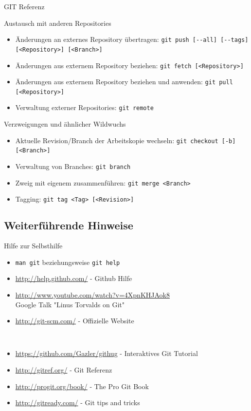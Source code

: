 \begin{frame}{GIT Referenz}
\begin{block}{Austausch mit anderen Repositories}
		\begin{itemize}
			\item Änderungen an externes Repository übertragen: \verb|git push [--all] [--tags] [<Repository>] [<Branch>]|
			\item Änderungen aus externem Repository beziehen: \verb|git fetch [<Repository>]|
			\item Änderungen aus externem Repository beziehen und anwenden: \verb|git pull [<Repository>]|
			\item Verwaltung externer Repositories: \verb|git remote|
		\end{itemize}
	\end{block}
	\begin{block}{Verzweigungen und ähnlicher Wildwuchs}
		\begin{itemize}
			\item Aktuelle Revision/Branch der Arbeitskopie wechseln: \verb|git checkout [-b] [<Branch>]|
			\item Verwaltung von Branches: \verb|git branch|
			\item Zweig mit eigenem zusammenführen: \verb|git merge <Branch>|
			\item Tagging: \verb|git tag <Tag> [<Revision>]|
		\end{itemize}
	\end{block}
\end{frame}

\subsection{Weiterführende Hinweise}
\begin{frame}[fragile]{Hilfe zur Selbsthilfe}
	\begin{itemize}
		\item \verb|man git| beziehungsweise \verb|git help|
		\item \url{http://help.github.com/} - Github Hilfe
		\item \url{http://www.youtube.com/watch?v=4XpnKHJAok8} \\
			Google Talk "Linus Torvalds on Git"
		\item \url{http://git-scm.com/} - Offizielle Website
	\end{itemize}
\ \\

\tiny
	\begin{itemize}
		\item \url{https://github.com/Gazler/githug} - Interaktives Git Tutorial
		\item \url{http://gitref.org/} - Git Referenz
		\item \url{http://progit.org/book/} - The Pro Git Book
		\item \url{http://gitready.com/} - Git tips and tricks
	\end{itemize}
\end{frame}

